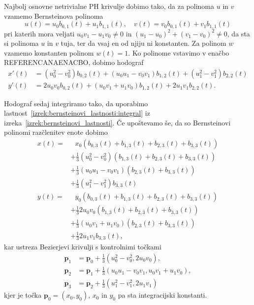 \documentclass[isrm2, tisk]{fmfdelo}
\newcommand{\p}{\textbf{p}}
\begin{document}
    Najbolj osnovne netrivialne PH krivulje dobimo tako, da za polinoma $u$ in $v$ vzamemo Bernsteinova polinoma
    \[u(t)=u_0b_{0,1}(t)+u_1b_{1,1}(t),\quad v(t)=v_0b_{0,1}(t)+v_1b_{1,1}(t)\]
    pri katerih mora veljati $u_0v_1-u_1v_0\neq 0$ in $(u_1-u_0)^2+(v_1-v_0)^2\neq 0$, da sta si polinoma $u$ in $v$ tuja, ter da vsaj en od njiju ni konstanten.
    Za polinom $w$ vzamemo konstanten polinom $w(t)=1$.
    Ko polinome vstavimo v enačbo REFERENCANAENACBO, dobimo hodograf
    \begin{align*}
        x'(t) &=(u_0^2-v_0^2)b_{0,2}(t)+(u_0u_1-v_0v_1)b_{1,2}(t) + (u_1^2-v_1^2)b_{2,2}(t)\\
        y'(t) &= 2u_0 v_0 b_{0,2}(t)+(u_0v_1+u_1v_0)b_{1,2}(t)+2u_1 v_1 b_{2,2}(t).
    \end{align*}

    Hodograf sedaj integriramo tako, da uporabimo lastnost~\ref{izrek:bernsteinovi_lastnosti:integral} iz izreka~\ref{izrek:bernsteinovi_lastnosti}.
    Če upoštevamo še, da so Bernsteinovi polinomi razčlenitev enote dobimo
    \begin{align*}
        x(t) = &\ \ \ x_0(b_{0,3}(t) + b_{1,3}(t) + b_{2,3}(t)+ b_{3,3}(t)) \\
        &+ \frac{1}{3}(u_0^2-v_0^2)(b_{1,3}(t) + b_{2,3}(t)+ b_{3,3}(t)) \\
        &+ \frac{1}{3}(u_0u_1-v_0v_1)(b_{2,3}(t)+ b_{3,3}(t)) \\
        &+ \frac{1}{3} (u_1^2-v_1^2)b_{3,3}(t)\\
        y(t) = &\ \ \  y_0(b_{0,3}(t) + b_{1,3}(t) + b_{2,3}(t)+ b_{3,3}(t)) \\
        &+ \frac{1}{3}2u_0 v_0(b_{1,3}(t) + b_{2,3}(t)+ b_{3,3}(t)) \\
        &+ \frac{1}{3}(u_0v_1+u_1v_0)(b_{2,3}(t)+ b_{3,3}(t)) \\
        &+ \frac{1}{3} 2u_1 v_1 b_{3,3}(t),
    \end{align*}
    kar ustreza Bezierjevi krivulji s kontrolnimi točkami
    \begin{align}
        \p_1 &=\p_0+\frac{1}{3}(u_0^2-v_0^2,2u_0v_0), \nonumber\\
        \p_2 &= \p_1+\frac{1}{3}(u_0u_1-v_0v_1, u_0v_1+u_1v_0),\nonumber\\
        \p_3 &= \p_2 + \frac{1}{3}(u_1^2-v_1^2, 2u_1v_1) \label{eq:ph-kontrolne}
    \end{align}
    kjer je točka $\p_0=(x_0,y_0)$, $x_0$ in $y_0$ pa sta integracijski konstanti.
\end{document}
